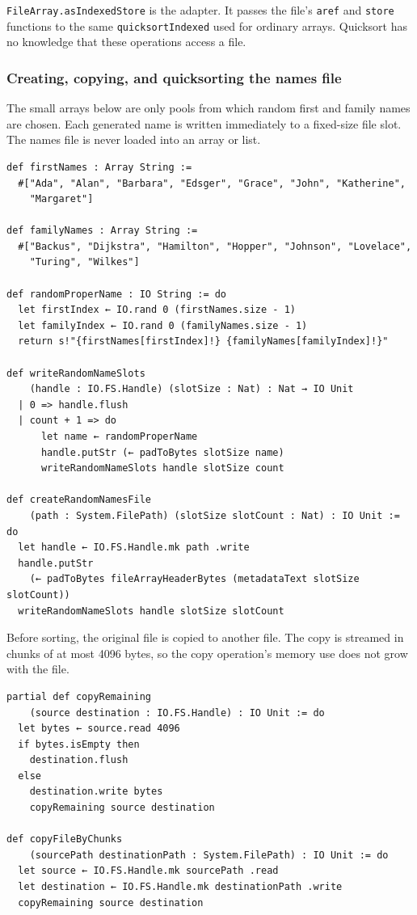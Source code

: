 \documentclass[11pt]{article}
\begin{document}
\texttt{FileArray.asIndexedStore} is the adapter.  It passes the file's \texttt{aref} and
\texttt{store} functions to the same \texttt{quicksortIndexed} used for ordinary arrays.
Quicksort has no knowledge that these operations access a file.
\subsubsection{Creating, copying, and quicksorting the names file}
\label{sec:org63d0cba}

The small arrays below are only pools from which random first and family names
are chosen.  Each generated name is written immediately to a fixed-size file
slot.  The names file is never loaded into an array or list.

\begin{verbatim}
def firstNames : Array String :=
  #["Ada", "Alan", "Barbara", "Edsger", "Grace", "John", "Katherine",
    "Margaret"]

def familyNames : Array String :=
  #["Backus", "Dijkstra", "Hamilton", "Hopper", "Johnson", "Lovelace",
    "Turing", "Wilkes"]

def randomProperName : IO String := do
  let firstIndex ← IO.rand 0 (firstNames.size - 1)
  let familyIndex ← IO.rand 0 (familyNames.size - 1)
  return s!"{firstNames[firstIndex]!} {familyNames[familyIndex]!}"

def writeRandomNameSlots
    (handle : IO.FS.Handle) (slotSize : Nat) : Nat → IO Unit
  | 0 => handle.flush
  | count + 1 => do
      let name ← randomProperName
      handle.putStr (← padToBytes slotSize name)
      writeRandomNameSlots handle slotSize count

def createRandomNamesFile
    (path : System.FilePath) (slotSize slotCount : Nat) : IO Unit := do
  let handle ← IO.FS.Handle.mk path .write
  handle.putStr
    (← padToBytes fileArrayHeaderBytes (metadataText slotSize slotCount))
  writeRandomNameSlots handle slotSize slotCount
\end{verbatim}

Before sorting, the original file is copied to another file.  The copy is
streamed in chunks of at most 4096 bytes, so the copy operation's memory use
does not grow with the file.

\begin{verbatim}
partial def copyRemaining
    (source destination : IO.FS.Handle) : IO Unit := do
  let bytes ← source.read 4096
  if bytes.isEmpty then
    destination.flush
  else
    destination.write bytes
    copyRemaining source destination

def copyFileByChunks
    (sourcePath destinationPath : System.FilePath) : IO Unit := do
  let source ← IO.FS.Handle.mk sourcePath .read
  let destination ← IO.FS.Handle.mk destinationPath .write
  copyRemaining source destination
\end{verbatim}
\end{document}
